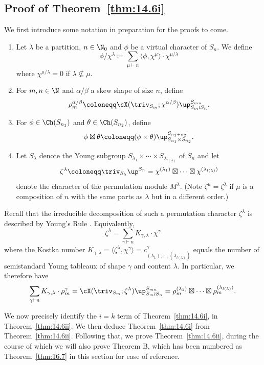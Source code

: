 \subsection{Proof of Theorem~\ref{thm:14.6i}}\label{sec:16}
We first introduce some notation in preparation for the proofs to come.
\begin{notation}\label{not:rho}
	\begin{enumerate}[label=\textup{(\roman*)}]
		\item \label{561} Let $\lambda$ be a partition, $n\in\N_0$ and $\phi$ be a virtual character of $S_n$.
		We define
		\[ \phi/\chi^\lambda\coloneqq  \sum_{\mu\vdash n}\langle \phi,\chi^\mu\rangle\cdot\chi^{\mu/\lambda} \]
		where $\chi^{\mu/\lambda}=0$ if $\lambda\not\subseteq\mu$.
		
		\item \label{562} For $m,n\in\N$ and $\alpha/\beta$ a skew shape of size $n$, define \[
		\rho^{\alpha/\beta}_m \coloneqq  \cX(\triv_{S_m};\chi^{\alpha/\beta})\up_{S_m\wr S_n}^{S_{mn}}.\] 
		
		\item \label{563} For $\phi\in\Ch(S_{n_1})$ and $\theta\in\Ch(S_{n_2})$, define
		\[ \phi\boxtimes\theta\coloneqq  (\phi\times\theta)\up_{S_{n_1}\times S_{n_2}}^{S_{n_1+n_2}}. \]
		
		\item \label{564} Let $S_\lambda$ denote the Young subgroup $S_{\lambda_1}\times\cdots\times S_{\lambda_{l(\lambda)}}$ of $S_n$ and let
		\[ \zeta^\lambda\coloneqq \triv_{S_\lambda}\up^{S_n} = \chi^{(\lambda_1)}\boxtimes\cdots\boxtimes \chi^{(\lambda_{l(\lambda)})} \]
		denote the character of the permutation module $M^\lambda$. (Note $\zeta^\mu=\zeta^\lambda$ if $\mu$ is a composition of $n$ with the same parts as $\lambda$ but in a different order.) 
	\end{enumerate}
\end{notation}

Recall that the irreducible decomposition of such a permutation character $\zeta^\lambda$ is described by Young's Rule \cite[2.8.5]{JK}. Equivalently,
\begin{equation}\label{eqn:kostka}
	\zeta^\lambda = \sum_{\gamma\vdash n} K_{\gamma,\lambda}\cdot \chi^\gamma
\end{equation}
where the Kostka number $K_{\gamma,\lambda} = \langle \zeta^\lambda,\chi^\gamma\rangle=c^\gamma_{(\lambda_1),\dotsc,(\lambda_{l(\lambda)})}$ equals the number of semistandard Young tableaux of shape $\gamma$ and content $\lambda$.
In particular, we therefore have
\begin{equation}\label{eqn:15.2}
	\sum_{\gamma\vdash n} K_{\gamma,\lambda}\cdot \rho^\gamma_m = \cX(\triv_{S_m}; \zeta^\lambda)\up_{S_m\wr S_n}^{S_{mn}} = \rho^{(\lambda_1)}_m\boxtimes\cdots\boxtimes\rho^{(\lambda_{l(\lambda)})}_m.
\end{equation}

We now precisely identify the $i=k$ term of Theorem~\ref{thm:14.6i}, in Theorem~\ref{thm:14.6ii}. We then deduce Theorem~\ref{thm:14.6i} from Theorem~\ref{thm:14.6ii}. Following that, we prove Theorem~\ref{thm:14.6ii}, during the course of which we will also prove Theorem B, which has been numbered as Theorem~\ref{thm:16.7} in this section for ease of reference.
